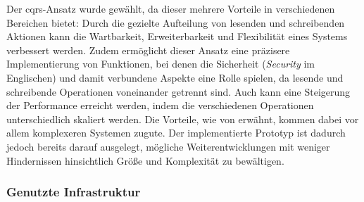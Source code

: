 \documentclass[a4paper,12pt,twoside]{scrreprt}
\begin{document}
Der \ac{cqrs}-Ansatz wurde gewählt, da dieser mehrere Vorteile in verschiedenen Bereichen bietet: Durch die gezielte Aufteilung von lesenden und schreibenden Aktionen kann die Wartbarkeit, Erweiterbarkeit und Flexibilität eines Systems verbessert werden. Zudem ermöglicht dieser Ansatz eine präzisere Implementierung von Funktionen, bei denen die Sicherheit (\textit{Security} im Englischen) und damit verbundene Aspekte eine Rolle spielen, da lesende und schreibende Operationen voneinander getrennt sind. Auch kann eine Steigerung der Performance erreicht werden, indem die verschiedenen Operationen unterschiedlich skaliert werden. Die Vorteile, wie von \cite{ingeno_software_2018} erwähnt, kommen dabei vor allem komplexeren Systemen zugute. Der implementierte Prototyp ist dadurch jedoch bereits darauf ausgelegt, mögliche Weiterentwicklungen mit weniger Hindernissen hinsichtlich Größe und Komplexität zu bewältigen. \cite[240]{ingeno_software_2018}

\subsubsection*{Genutzte Infrastruktur}
\label{sub-sub-sec:backend-genutzte-infrastruktur}
\end{document}
